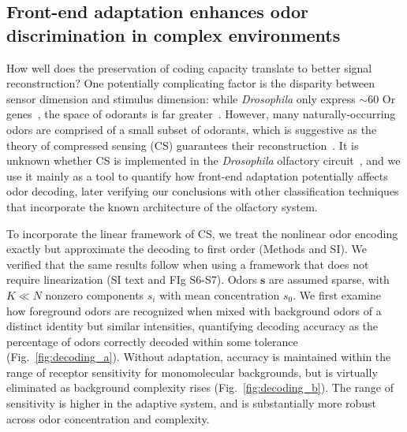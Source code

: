 \documentclass[9pt,twocolumn,twoside]{pnas-new}
\begin{document}
\subsection*{Front-end adaptation enhances odor discrimination in complex environments}

How well does the preservation of coding capacity translate to better signal reconstruction?
One potentially complicating factor is the disparity between sensor dimension and stimulus dimension: while \textit{Drosophila} only express $\sim 60$ Or genes~\cite{olfactory_sensory_map}, the space of odorants is far greater~\cite{vijay_1}. However, many naturally-occurring odors are comprised of a small subset of odorants, which is suggestive as the theory of compressed sensing (CS) guarantees their reconstruction~\cite{CS_donoho, CS_tao}. It is unknown whether CS is implemented in the \textit{Drosophila} olfactory circuit~\cite{chlovskii_pevlavan}, and we use it mainly as a tool to quantify how front-end adaptation potentially affects odor decoding, later verifying our conclusions with other classification techniques that incorporate the known architecture of the olfactory system. 

To incorporate the linear framework of CS, we treat the nonlinear odor encoding exactly but approximate the decoding to first order (Methods and SI). We verified that the same results follow when using a framework that does not require linearization (SI text and FIg S6-S7). Odors $\mathbf s$ are assumed sparse, with $K \ll N$ nonzero components $s_i$ with mean concentration  $s_0$. We first examine how foreground odors are recognized when mixed with background odors of a distinct identity but similar intensities, quantifying decoding accuracy as the percentage of odors correctly decoded within some tolerance (Fig.~\ref{fig:decoding_a}). Without adaptation, accuracy is maintained within the range of receptor sensitivity for monomolecular backgrounds, but is virtually eliminated as background complexity rises (Fig.~\ref{fig:decoding_b}). The range of sensitivity is higher in the adaptive system, and is substantially more robust across odor concentration and complexity. 
\end{document}
